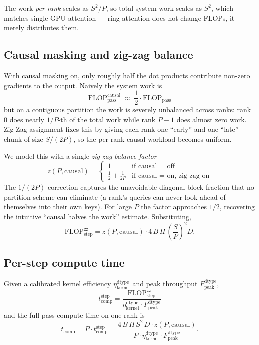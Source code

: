 \documentclass[11pt]{article}
\newcommand{\flops}{\mathrm{FLOP}}
\newcommand{\peak}{\mathrm{peak}}
\newcommand{\comp}{\mathrm{comp}}
\newcommand{\step}{\mathrm{step}}
\newcommand{\zz}{\mathrm{zz}}
\newcommand{\dtype}{\mathrm{dtype}}
\begin{document}
The work \emph{per rank} scales as $S^2/P$, so total system work
scales as $S^2$, which matches single-GPU attention --- ring attention
does not change FLOPs, it merely distributes them.

\subsection{Causal masking and zig-zag balance}

With causal masking on, only roughly half the dot products contribute
non-zero gradients to the output. Naively the system work is
\begin{equation}
  \flops_{\text{pass}}^{\text{causal}}
  \;\approx\; \frac{1}{2}\cdot \flops_{\text{pass}}
\end{equation}
but on a contiguous partition the work is severely unbalanced across
ranks: rank $0$ does nearly $1/P$-th of the total work while rank
$P-1$ does almost zero work. Zig-Zag assignment fixes this by giving
each rank one ``early'' and one ``late'' chunk of size $S/(2P)$, so
the per-rank causal workload becomes uniform.

We model this with a single \emph{zig-zag balance factor}
\begin{equation}
  z(P, \text{causal}) =
  \begin{cases}
    1 & \text{if causal $=$ off} \\
    \tfrac{1}{2} + \tfrac{1}{2 P} & \text{if causal $=$ on, zig-zag on}
  \end{cases}
  \label{eq:zigzag}
\end{equation}
The $1/(2P)$ correction captures the unavoidable
diagonal-block fraction that no partition scheme can eliminate (a
rank's queries can never look ahead of themselves into their own
keys). For large $P$ the factor approaches $1/2$, recovering the
intuitive ``causal halves the work'' estimate. Substituting,
\begin{equation}
  \flops_\step^\zz
  = z(P, \text{causal}) \cdot 4\,B\,H\,\left(\frac{S}{P}\right)^{\!2} D .
  \label{eq:flops_step_zz}
\end{equation}

\subsection{Per-step compute time}

Given a calibrated kernel efficiency $\eta_{\text{kernel}}^\dtype$ and
peak throughput $F_\peak^\dtype$,
\begin{equation}
  \boxed{\;
    t_\comp^\step
    = \frac{\flops_\step^\zz}{\eta_{\text{kernel}}^\dtype \cdot F_\peak^\dtype}
    \;}
  \label{eq:tcomp_step}
\end{equation}
and the full-pass compute time on one rank is
\begin{equation}
  t_\comp
  = P \cdot t_\comp^\step
  = \frac{4\,B\,H\,S^{2}\,D \cdot z(P,\text{causal})}
         {P \cdot \eta_{\text{kernel}}^\dtype \cdot F_\peak^\dtype} .
  \label{eq:tcomp_pass}
\end{equation}
\end{document}
